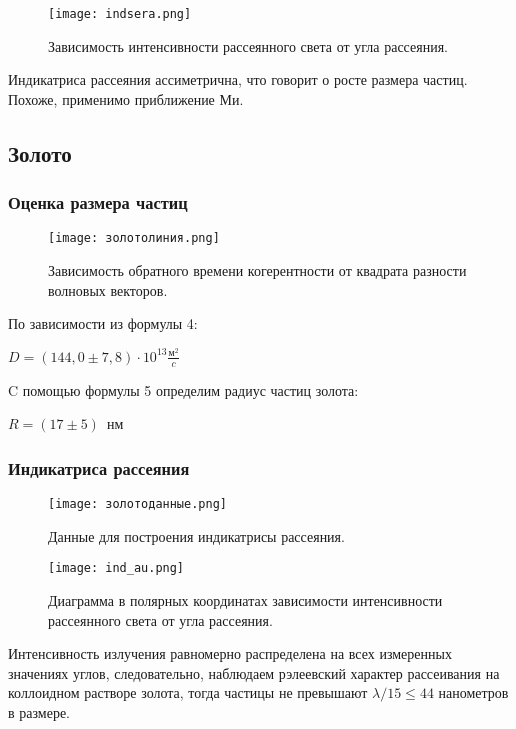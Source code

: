 \documentclass[a4paper,10pt]{article}
\begin{document}
\begin{figure}[H]
    \centering
    \texttt{[image: indsera.png]}
    \caption{Зависимость интенсивности рассеянного света от угла рассеяния.}
    \label{fig:enter-label}
\end{figure}

Индикатриса рассеяния ассиметрична, что говорит о росте размера частиц. Похоже, применимо приближение Ми.

\subsection{Золото}

\subsubsection{Оценка размера частиц}

\begin{figure}[H]
    \centering
    \texttt{[image: золотолиния.png]}
    \caption{Зависимость обратного времени когерентности от квадрата разности волновых векторов.}
    \label{fig:enter-label}
\end{figure}
По зависимости из формулы 4:
\begin{center}
    $D = (144,0 \pm 7,8)\cdot 10^{13} \frac{\text{м}^2}{c}$ 
\end{center}
C помощью формулы 5 определим радиус частиц золота:
\begin{center}
    $R = (17\pm 5)$~нм
\end{center}


\subsubsection{Индикатриса рассеяния}

\begin{figure}
    \centering
    \texttt{[image: золотоданные.png]}
    \caption{Данные для построения индикатрисы рассеяния.}
    \label{fig:enter-label}
\end{figure}

\begin{figure}[H]
    \centering
    \texttt{[image: ind\_au.png]}
    \caption{Диаграмма в полярных координатах зависимости интенсивности рассеянного света от угла рассеяния.}
    \label{fig:enter-label}
\end{figure}


Интенсивность излучения равномерно распределена на всех измеренных значениях углов, следовательно, наблюдаем рэлеевский характер рассеивания на коллоидном растворе золота, тогда частицы не превышают $\lambda/15 \leq 44$ нанометров в размере. 
\end{document}
